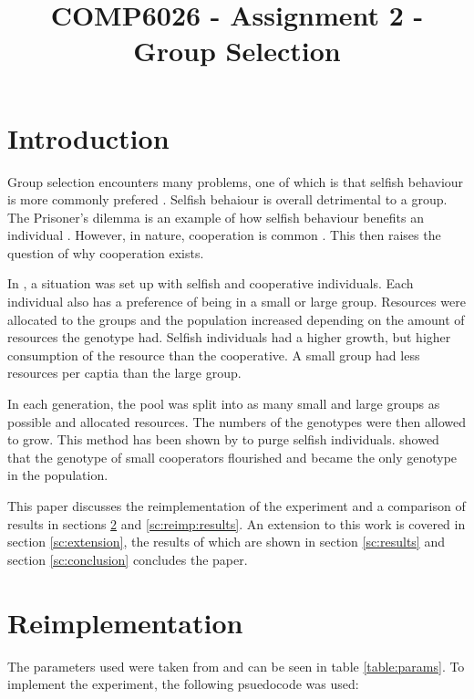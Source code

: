 \documentclass[11pt]{ecsarticle}
\title{COMP6026 - Assignment 2 - Group Selection}
\begin{document}
\maketitle
 
\section{Introduction}

Group selection encounters many problems, one of which is that selfish behaviour is more commonly prefered \cite{powers2012efficacy}.
Selfish behaiour is overall detrimental to a group.
The Prisoner's dilemma is an example of how selfish behaviour benefits an individual \cite{axelrod1987evolution}. 
However, in nature, cooperation is common \citep{szathmary1995major}. 
This then raises the question of why cooperation exists. 

In \cite{powers2007individual}, a situation was set up with selfish and cooperative individuals.
Each individual also has a preference of being in a small or large group. 
Resources were allocated to the groups and the population increased depending on the amount of resources the genotype had. 
Selfish individuals had a higher growth, but higher consumption of the resource than the cooperative.
A small group had less resources per captia than the large group.

In each generation, the pool was split into as many small and large groups as possible and allocated resources.
The numbers of the genotypes were then allowed to grow. 
This method has been shown by \cite{wilson1975theory} to purge selfish individuals. 
\cite{powers2007individual} showed that the genotype of small cooperators flourished and became the only genotype in the population. 


This paper discusses the reimplementation of the experiment \cite{powers2007individual} and a comparison of results in sections \ref{sc:reimplementation} and \ref{sc:reimp:results}.
An extension to this work is covered in section \ref{sc:extension}, the results of which are shown in section \ref{sc:results} and section \ref{sc:conclusion} concludes the paper.


\section{Reimplementation}\label{sc:reimplementation}

The parameters used were taken from \cite{powers2007individual} and can be seen in table \ref{table:params}.
To implement the experiment, the following psuedocode was used:
\end{document}
